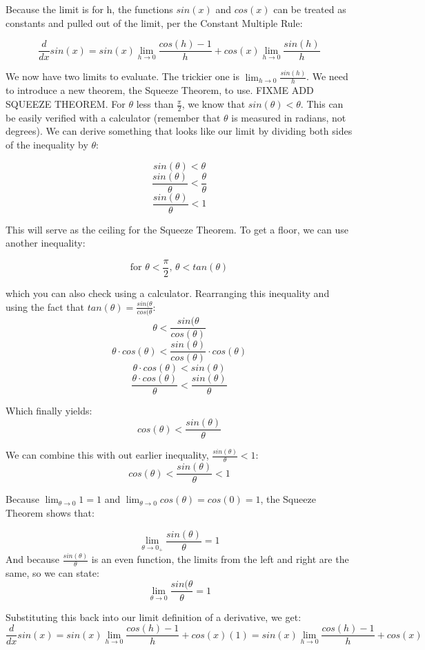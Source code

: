 Because the limit is for h, the functions $sin(x)$ and $cos(x)$ can be treated as constants and pulled out of the limit, per the Constant Multiple Rule:

$$\frac{d}{dx}sin(x)=sin(x)\lim_{h \to 0}\frac{cos(h)-1}{h}+cos(x)\lim_{h \to 0}\frac{sin(h)}{h}$$

We now have two limits to evaluate. The trickier one is $\lim_{h \to 0}\frac{sin(h)}{h}$. We need to introduce a new theorem, the Squeeze Theorem, to use. FIXME ADD SQUEEZE THEOREM. For $\theta$ less than $\frac{\pi}{2}$, we know that $sin(\theta)<\theta$. This can be easily verified with a calculator (remember that $\theta$ is measured in radians, not degrees). We can derive something that looks like our limit by dividing both sides of the inequality by $\theta$:

$$sin(\theta)<\theta$$
$$\frac{sin(\theta)}{\theta}<\frac{\theta}{\theta}$$
$$\frac{sin(\theta)}{\theta}<1$$

This will serve as the ceiling for the Squeeze Theorem. To get a floor, we can use another inequality:

$$\text{for }\theta < \frac{\pi}{2} \text{, } \theta < tan(\theta)$$

which you can also check using a calculator. Rearranging this inequality and using the fact that $tan(\theta)=\frac{sin(\theta}{cos(\theta}$:
$$\theta<\frac{sin(\theta}{cos(\theta)}$$
$$\theta \cdot cos(\theta)<\frac{sin(\theta)}{cos(\theta)}\cdot cos(\theta)$$
$$\theta \cdot cos(\theta) < sin(\theta)$$
$$\frac{\theta \cdot cos(\theta)}{\theta} < \frac{sin(\theta)}{\theta}$$

Which finally yields:
$$cos(\theta)<\frac{sin(\theta)}{\theta}$$

We can combine this with out earlier inequality, $\frac{sin(\theta)}{\theta}<1$:
$$cos(\theta)<\frac{sin(\theta)}{\theta}<1$$

Because $\lim_{\theta \to 0}1 = 1$ and $\lim_{\theta \to 0}cos(\theta)=cos(0)=1$, the Squeeze Theorem shows that:

$$\lim_{\theta \to 0_+}\frac{sin(\theta)}{\theta}=1$$
And because $\frac{sin(\theta)}{\theta}$ is an even function, the limits from the left and right are the same, so we can state:
$$\lim_{\theta \to 0}\frac{sin(\theta}{\theta} = 1$$

Substituting this back into our limit definition of a derivative, we get:
$$\frac{d}{dx}sin(x)=sin(x)\lim_{h \to 0}\frac{cos(h)-1}{h}+cos(x)(1)=sin(x)\lim_{h \to 0}\frac{cos(h)-1}{h}+cos(x)$$

